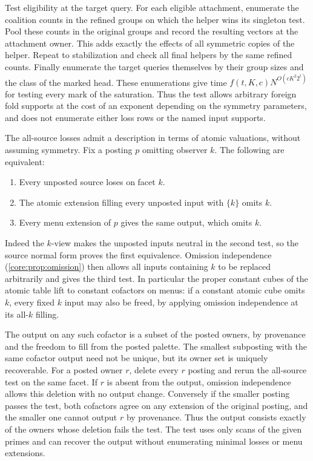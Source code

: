 Test eligibility at the target query. For each eligible
attachment, enumerate the coalition counts in the refined
groups on which the helper wins its singleton test. Pool
these counts in the original groups and record the resulting
vectors at the attachment owner. This adds exactly the
effects of all symmetric copies of the helper. Repeat to
stabilization and check all final helpers by the same refined
counts. Finally enumerate the target queries themselves by
their group sizes and the class of the marked head. These
enumerations give time $f(t,K,c)N^{O(cK^2 2^t)}$ for testing
every mark of the saturation. Thus the test allows arbitrary
foreign fold supports at the cost of an exponent depending
on the symmetry parameters, and does not enumerate either
loss rows or the named input supports.

The all-source losses admit a description in terms of atomic
valuations, without assuming symmetry. Fix a posting $p$ omitting
observer $k$. The following are equivalent:
\begin{enumerate}
\item Every unposted source loses on facet $k$.
\item The atomic extension filling every unposted input with
$\{k\}$ omits $k$.
\item Every menu extension of $p$ gives the same output, which
omits $k$.
\end{enumerate}
Indeed the $k$-view makes the unposted inputs neutral in the
second test, so the source normal form proves the first
equivalence. Omission independence (\cref{core:prop:omission})
then allows all inputs containing $k$ to be replaced arbitrarily
and gives the third test. In particular the proper constant
cubes of the atomic table lift to constant cofactors on menus:
if a constant atomic cube omits $k$, every fixed $k$ input may
also be freed, by applying omission independence at its
all-$k$ filling.

The output on any such cofactor is a subset of the posted owners,
by provenance and the freedom to fill from the posted palette.
The smallest subposting with the same cofactor output need not
be unique, but its owner set is uniquely recoverable. For a
posted owner $r$, delete every $r$ posting and rerun the
all-source test on the same facet. If $r$ is absent from the
output, omission independence allows this deletion with no
output change. Conversely if the smaller posting passes the
test, both cofactors agree on any extension of the original
posting, and the smaller one cannot output $r$ by provenance.
Thus the output consists exactly of the owners whose deletion
fails the test. The test uses only scans of the given primes
and can recover the output without enumerating minimal losses
or menu extensions.

